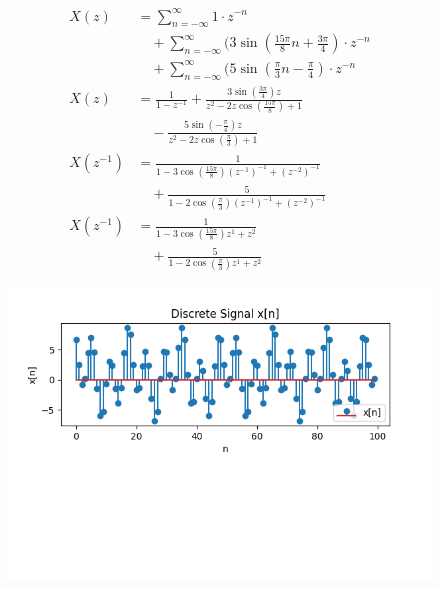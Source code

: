 \documentclass[journal,12pt,twocolumn]{IEEEtran}
\begin{document}
\begin{align}
X(z) &= \sum_{n=-\infty}^{\infty} 1 \cdot z^{-n} \\
&\quad + \sum_{n=-\infty}^{\infty} (3\sin\left(\frac{15\pi}{8}n + \frac{3\pi}{4}\right) \cdot z^{-n} \\
&\quad + \sum_{n=-\infty}^{\infty} (5\sin\left(\frac{\pi}{3}n - \frac{\pi}{4}\right) \cdot z^{-n}\\
X(z) &= \frac{1}{1 - z^{-1}} + \frac{3\sin\left(\frac{3\pi}{4}\right)z}{z^2 - 2z\cos\left(\frac{15\pi}{8}\right) + 1} \\
&\quad - \frac{5\sin\left(-\frac{\pi}{4}\right)z}{z^2 - 2z\cos\left(\frac{\pi}{3}\right) + 1}\\
X(z^{-1}) &= \frac{1}{1 - 3\cos\left(\frac{15\pi}{8}\right)(z^{-1})^{-1} + (z^{-2})^{-1}} \\
&\quad + \frac{5}{1 - 2\cos\left(\frac{\pi}{3}\right)(z^{-1})^{-1} + (z^{-2})^{-1}}\\
X(z^{-1})&= \frac{1}{1 - 3\cos\left(\frac{15\pi}{8}\right)z^{1} + z^{2}} \\
&\quad + \frac{5}{1 - 2\cos\left(\frac{\pi}{3}\right)z^{1} + z^{2}}
\end{align}
\begin{figure}[!ht] 
\centering
\includegraphics[width=2\columnwidth]{graph.png}
\label{fig:Graph1}
\end{figure}
\end{document}
